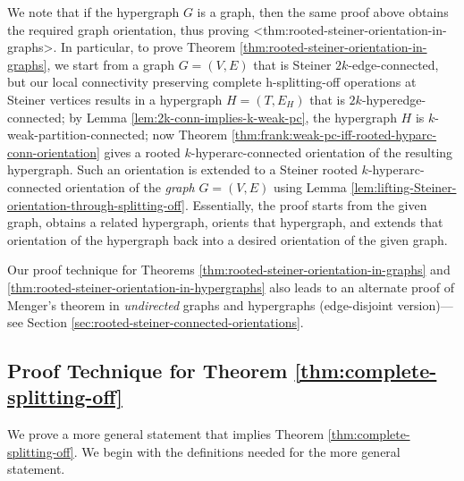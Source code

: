 \documentclass{article}
\def\Cref#1{<#1>}%
\begin{document}
We note that if the hypergraph $G$ is a graph, then the same proof above obtains the required graph orientation, thus proving \Cref{thm:rooted-steiner-orientation-in-graphs}.
In particular, to prove Theorem \ref{thm:rooted-steiner-orientation-in-graphs}, we start from a graph $G=(V, E)$ that is Steiner $2k$-edge-connected, but our local connectivity preserving complete h-splitting-off operations at Steiner vertices results in a hypergraph $H=(T, E_H)$ that is $2k$-hyperedge-connected; by Lemma \ref{lem:2k-conn-implies-k-weak-pc}, the hypergraph $H$ is $k$-weak-partition-connected; now Theorem \ref{thm:frank:weak-pc-iff-rooted-hyparc-conn-orientation} gives a rooted $k$-hyperarc-connected orientation of the resulting hypergraph. Such an orientation is extended to a  Steiner rooted $k$-hyperarc-connected orientation of the \emph{graph} $G=(V, E)$ using Lemma \ref{lem:lifting-Steiner-orientation-through-splitting-off}. Essentially, the proof starts from the given graph, obtains a related hypergraph, orients that hypergraph, and extends that orientation of the hypergraph back into a desired orientation of the given graph. 

Our proof technique for Theorems \ref{thm:rooted-steiner-orientation-in-graphs} and \ref{thm:rooted-steiner-orientation-in-hypergraphs} also leads to an alternate proof of Menger's theorem in \emph{undirected} graphs and hypergraphs (edge-disjoint version)---see Section \ref{sec:rooted-steiner-connected-orientations}. 

\subsection{Proof Technique for Theorem \ref{thm:complete-splitting-off}}
We prove a more general statement that implies Theorem \ref{thm:complete-splitting-off}. We begin with the definitions needed for the more general statement. 
\end{document}
